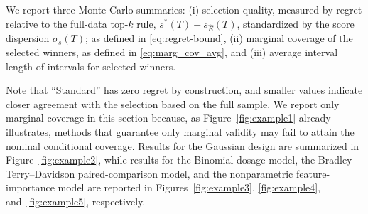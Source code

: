 \documentclass[12pt]{article}
\newcommand{\Ehat}{\widehat{E}}
\newcommand{\snoise}{\sigma_{s}}
\begin{document}
We report three Monte Carlo summaries: (i) selection quality, measured by regret relative to the full-data top-$k$ rule, $s^*(T)-s_{\Ehat}(T)$,
standardized by the score dispersion $\snoise(T)$; as defined in \eqref{eq:regret-bound}, (ii) marginal coverage of the selected winners, as defined in \eqref{eq:marg_cov_avg}, and (iii) average interval length of intervals for selected winners. 

Note that ``Standard'' has zero regret by construction, and smaller values indicate closer agreement with the selection based on the full sample.
We report only marginal coverage in this section because, as Figure~\ref{fig:example1} already illustrates, methods that guarantee only marginal validity may fail to attain the nominal conditional coverage. 
Results for the Gaussian design are summarized in Figure~\ref{fig:example2}, while results for the Binomial dosage model, the Bradley--Terry--Davidson paired-comparison model, and the nonparametric feature-importance model are reported in Figures~\ref{fig:example3}, \ref{fig:example4}, and~\ref{fig:example5}, respectively. 
\end{document}
